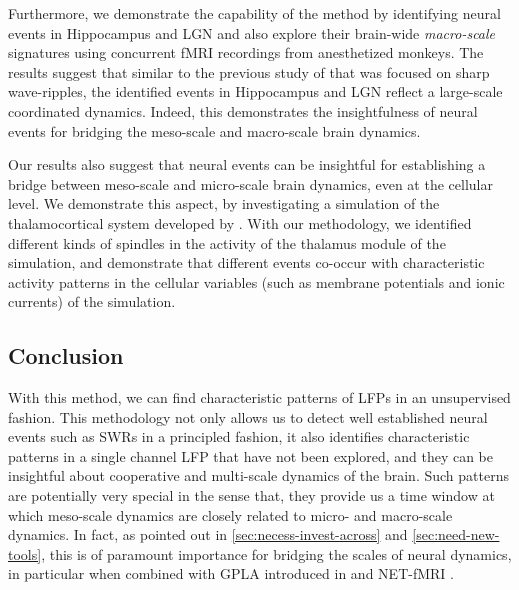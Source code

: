 Furthermore, we demonstrate the capability of the method by identifying neural events in Hippocampus and LGN and also explore their brain-wide \emph{macro-scale} signatures using concurrent fMRI recordings from anesthetized monkeys.
The results suggest that similar to the previous study of \citet{logothetisHippocampalCorticalInteraction2012} that was focused on sharp wave-ripples,
the identified events in Hippocampus and LGN reflect a large-scale coordinated dynamics.
Indeed, this demonstrates the insightfulness of neural events for bridging the meso-scale and macro-scale brain dynamics.


Our results also suggest that neural events can be insightful for establishing a bridge between meso-scale and micro-scale brain dynamics, even at the cellular level.
We demonstrate this aspect, by investigating a simulation of the thalamocortical system developed by \citet{costaThalamocorticalNeuralMass2016}.
With our methodology, we identified different kinds of spindles in the activity of the thalamus module of the simulation,
and demonstrate that different events co-occur with characteristic activity patterns in the cellular variables (such as membrane potentials and ionic currents) of the simulation.

\subsection*{Conclusion}

With this method, we can find characteristic patterns of LFPs in an unsupervised fashion.
This methodology not only allows us to detect well established neural events such as SWRs in a principled fashion,
it also identifies characteristic patterns in a single channel LFP that have not been explored, and they can be insightful about cooperative and multi-scale dynamics of the brain.
Such patterns are potentially very special in the sense that,
they provide us a time window at which meso-scale dynamics are closely related to micro- and macro-scale dynamics.
In fact, as pointed out in \autoref{sec:necess-invest-across} and \autoref{sec:need-new-tools}, this is of paramount importance for bridging the scales of neural dynamics,
in particular when combined with GPLA introduced in  and NET-fMRI \cite{logothetisNeuralEventTriggeredFMRILargescale2014}.




